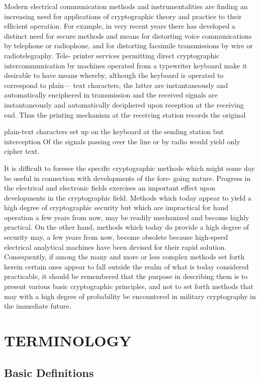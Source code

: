 \mypara Modern electrical communication methods and instrumentalities are
ﬁnding an increasing need for applications of cryptographic theory and
practice to their efﬁcient operation. For example, in very recent years
there has developed a distinct need for secure methods and means for
distorting voice communications by telephone or radiophone, and
for distorting facsimile transmissions by wire or radiotelegraphy. Tele-
printer services permitting direct cryptographic intercommunication by
machines operated from a typewriter keyboard make it desirable to have
means whereby, although the keyboard is operated to correspond to plain—
text characters, the latter are instantaneously and automatically
enciphered in transmission and the received signals are instantaneously
and automatically deciphered upon reception at the receiving end. Thus
the printing mechanism at the receiving station records the original


plain-text characters set up on the keyboard at the sending station but
interception Of the signals passing over the line or by radio would yield
only cipher text.

\mypara It is difficult to foresee the speciﬁc cryptographic methods which
might some day be useful in connection with developments of the fore-
going nature. Progress in the electrical and electronic ﬁelds exercises an
important effect upon developments in the cryptographic ﬁeld. Methods
which today appear to yield a high degree of cryptographic security but
which are impractical for hand operation a few years from now, may be
readily mechanized and become highly practical. On the other hand,
methods which today do provide a high degree of security may, a few
years from now, become obsolete because high-speed electrical analytical
machines have been devised for their rapid solution. Consequently, if
among the many and more or less complex methods set forth herein
certain ones appear to fall outside the realm of what is today considered
practicable, it should be remembered that the purpose in describing them
is to present various basic cryptographic principles, and not to set forth
methods that may with a high degree of probability be encountered in
military cryptography in the immediate future.

\section{TERMINOLOGY}

\subsection{Basic Definitions}

